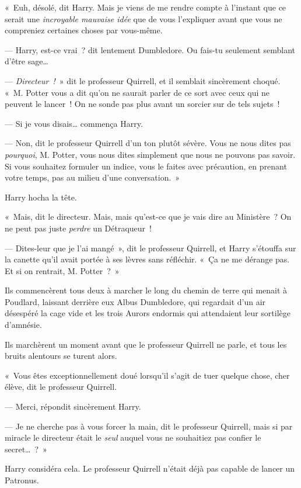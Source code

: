 «~Euh, désolé, dit Harry. Mais je viens de me rendre compte à l'instant que ce serait une \emph{incroyable mauvaise idée} que de vous l'expliquer avant que vous ne compreniez certaines choses par vous-même.

--- Harry, est-ce vrai~? dit lentement Dumbledore. Ou fais-tu seulement semblant d'être sage…

--- \emph{Directeur~!}~» dit le professeur Quirrell, et il semblait sincèrement choqué. «~M. Potter vous a dit qu'on ne saurait parler de ce sort avec ceux qui ne peuvent le lancer~! On ne sonde pas plus avant un sorcier sur de tels sujets~!

--- Si je vous disais… commença Harry.

--- Non, dit le professeur Quirrell d'un ton plutôt sévère. Vous ne nous dites pas \emph{pourquoi}, M. Potter, vous nous dites simplement que nous ne pouvons pas savoir. Si vous souhaitez formuler un indice, vous le faites avec précaution, en prenant votre temps, pas au milieu d'une conversation.~»

Harry hocha la tête.

«~Mais, dit le directeur. Mais, mais qu'est-ce que je vais dire au Ministère~? On ne peut pas juste \emph{perdre} un Détraqueur~!

--- Dites-leur que je l'ai mangé~», dit le professeur Quirrell, et Harry s'étouffa sur la canette qu'il avait portée à ses lèvres sans réfléchir. «~Ça ne me dérange pas. Et si on rentrait, M. Potter~?~»

Ils commencèrent tous deux à marcher le long du chemin de terre qui menait à Poudlard, laissant derrière eux Albus Dumbledore, qui regardait d'un air désespéré la cage vide et les trois Aurors endormis qui attendaient leur sortilège d'amnésie.


Ils marchèrent un moment avant que le professeur Quirrell ne parle, et tous les bruits alentours se turent alors.

«~Vous êtes exceptionnellement doué lorsqu'il s'agit de tuer quelque chose, cher élève, dit le professeur Quirrell.

--- Merci, répondit sincèrement Harry.

--- Je ne cherche pas à vous forcer la main, dit le professeur Quirrell, mais si par miracle le directeur était le \emph{seul} auquel vous ne souhaitiez pas confier le secret…~?~»

Harry considéra cela. Le professeur Quirrell n'était déjà pas capable de lancer un Patronus.

